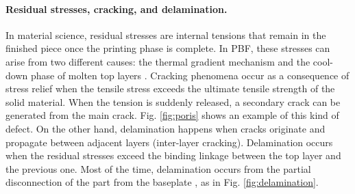 \paragraph{Residual stresses, cracking, and delamination.} In material science, residual stresses are internal tensions that remain in the finished piece once the printing phase is complete. In PBF, these stresses can arise from two different causes: the thermal gradient mechanism and the cool-down phase of molten top layers \cite{mercelis_residual_2006}. Cracking phenomena occur as a consequence of stress relief when the tensile stress exceeds the ultimate tensile strength of the solid material. When the tension is suddenly released, a secondary crack can be generated from the main crack. Fig. \ref{fig:poris} shows an example of this kind of defect. On the other hand, delamination happens when cracks originate and propagate between adjacent layers (inter-layer cracking). Delamination occurs when the residual stresses exceed the binding linkage between the top layer and the previous one. Most of the time, delamination occurs from the partial disconnection of the part from the baseplate \cite{sames_metallurgy_2016}, as in Fig. \ref{fig:delamination}.
